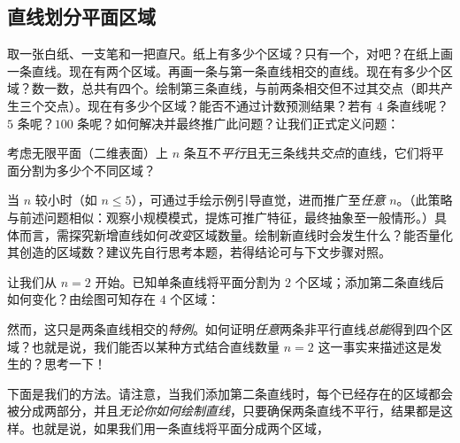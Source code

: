 \subsection{直线划分平面区域}

取一张白纸、一支笔和一把直尺。纸上有多少个区域？只有一个，对吧？在纸上画一条直线。现在有两个区域。再画一条与第一条直线相交的直线。现在有多少个区域？数一数，总共有四个。绘制第三条直线，与前两条相交但不过其交点（即共产生三个交点）。现在有多少个区域？能否不通过计数预测结果？若有 $4$ 条直线呢？$5$ 条呢？$100$ 条呢？如何解决并最终推广此问题？让我们正式定义问题：

考虑无限平面（二维表面）上 $n$ 条互不\emph{平行}且无三条线共\emph{交点}的直线，它们将平面分割为多少个不同区域？

当 $n$ 较小时（如 $n \leq 5$），可通过手绘示例引导直觉，进而推广至\emph{任意} $n$。（此策略与前述问题相似：观察小规模模式，提炼可推广特征，最终抽象至一般情形。）具体而言，需探究新增直线如何\emph{改变}区域数量。绘制新直线时会发生什么？能否量化其创造的区域数？建议先自行思考本题，若得结论可与下文步骤对照。

让我们从 $n = 2$ 开始。已知单条直线将平面分割为 $2$ 个区域；添加第二条直线后如何变化？由绘图可知存在 $4$ 个区域：

\begin{center}
\end{center}

然而，这只是两条直线相交的\emph{特例}。如何证明\emph{任意}两条非平行直线\emph{总能}得到四个区域？也就是说，我们能否以某种方式结合直线数量 $n = 2$ 这一事实来描述这是发生的？思考一下！

下面是我们的方法。请注意，当我们添加第二条直线时，每个已经存在的区域都会被分成两部分，并且\emph{无论你如何绘制直线}，只要确保两条直线不平行，结果都是这样。也就是说，如果我们用一条直线将平面分成两个区域，

\begin{center}
\end{center}

